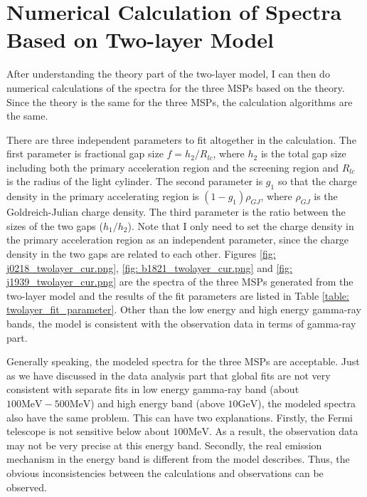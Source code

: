 \documentclass[12pt]{report}
\begin{document}
  \section{Numerical Calculation of Spectra Based on Two-layer Model}
    After understanding the theory part of the two-layer model, 
    I can then do numerical calculations of the spectra for the three MSPs
    based on the theory. Since the theory is the same for the three MSPs, the 
    calculation algorithms are the same. 

    There are three independent parameters to fit altogether in the calculation. 
    The first parameter is fractional gap size $f=h_{2}/R_{lc}$, where $h_{2}$ is the 
    total gap size including both the primary acceleration region and the screening region 
    and $R_{lc}$ is the radius of the light cylinder. The second parameter is $g_{1}$ so that
    the charge density in the primary accelerating region is $\left(1-g_{1}\right) \rho_{GJ}$, 
    where $\rho_{GJ}$ is the Goldreich-Julian charge density. The third parameter is the ratio 
    between the sizes of the two gaps ($h_{1}/h_{2}$). Note that I only need to set the charge 
    density in the primary acceleration region as an independent parameter, since the charge 
    density in the two gaps are related to each other. Figures 
    \ref{fig: j0218_twolayer_cur.png}, \ref{fig: b1821_twolayer_cur.png} and 
    \ref{fig: j1939_twolayer_cur.png}
    are the spectra of the three MSPs generated from the two-layer model and the results of the 
    fit parameters are listed in Table \ref{table: twolayer_fit_parameter}. Other than the 
    low energy and high energy gamma-ray bands, the model is consistent with the observation 
    data in terms of gamma-ray part. 

    Generally speaking, the modeled spectra for the three MSPs are acceptable. Just as 
    we have discussed in the data analysis part that global fits are not very consistent 
    with separate fits in low energy gamma-ray band (about $100\mbox{MeV} - 500\mbox{MeV}$) 
    and high energy band (above $10 \mbox{GeV}$), the modeled spectra also have the same 
    problem. This can have two explanations. Firstly, the Fermi telescope is not sensitive 
    below about $100 \mbox{MeV}$. As a result, the observation data may not be very precise
    at this energy band. Secondly, the real emission mechanism in the energy band is different 
    from the model describes. Thus, the obvious inconsistencies between the calculations 
    and observations can be observed.
\end{document}
